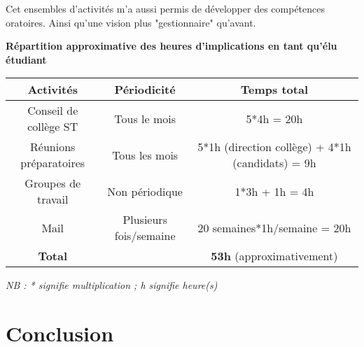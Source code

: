 \documentclass{article}
\begin{document}
Cet ensembles d'activités m'a aussi permis de développer des compétences oratoires. Ainsi qu'une vision plus "gestionnaire" qu'avant. 
\newpage
\begin{center}
\textbf{Répartition approximative des heures d'implications en tant qu'élu étudiant}
\vspace*{10pt}

\begin{tabular}{|c|c|c|}
\hline 
Activités & Périodicité & Temps total\\ 
\hline 
Conseil de collège ST & Tous le mois & 5*4h = 20h \\ 
\hline 
Réunions préparatoires & Tous les mois & 5*1h (direction collège) + 4*1h (candidats) = 9h\\ 
\hline 
Groupes de travail & Non périodique & 1*3h + 1h = 4h\\ 
\hline 
Mail & Plusieurs fois/semaine & 20 semaines*1h/semaine = 20h\\ 
\hline 
\textbf{Total} &  & \textbf{53h} (approximativement) \\ 
\hline 
\end{tabular} 
\end{center}
\textit{NB : * signifie multiplication ; h signifie heure(s)}

\section*{Conclusion}
\end{document}
